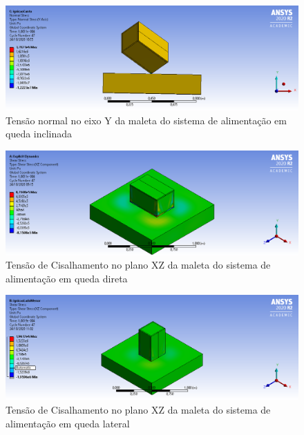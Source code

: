 \begin{apendicesenv}
\begin{figure}[htb]
    \centering
    \includegraphics[width=1.0\textwidth, angle=0]{figuras/estrutura_simulacaoImpacto/ignicaoNormalYCanto.png}
    \caption{Tensão normal no eixo Y da maleta do sistema de alimentação em queda inclinada}
    \label{fig:simulacaoImpacto_03}
\end{figure}


\begin{figure}[htb]
    \centering
    \includegraphics[width=1.0\textwidth, angle=0]{figuras/estrutura_simulacaoImpacto/ignicaoCisalhamentoXZLadoMaior.png}
    \caption{Tensão de Cisalhamento no plano XZ da maleta do sistema de alimentação em queda direta}
    \label{fig:simulacaoImpacto_04}
\end{figure}

\begin{figure}[htb]
    \centering
    \includegraphics[width=1.0\textwidth, angle=0]{figuras/estrutura_simulacaoImpacto/ignicaoCisalhamentoXZLadoMenor.png}
    \caption{Tensão de Cisalhamento no plano XZ da maleta do sistema de alimentação em queda lateral}
    \label{fig:simulacaoImpacto_05}
\end{figure}


\end{apendicesenv}

